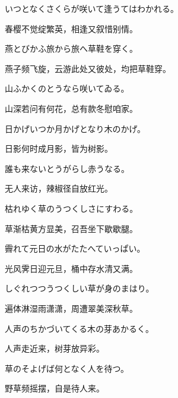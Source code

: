 \begin{haiku}
    {\FH いつとなくさくらが咲いて逢うてはわかれる。}

    {\FK 春樱不觉绽繁英，相逢又叙惜别情。}
\end{haiku}

\begin{haiku}
    {\FH 燕とびかふ旅から旅へ草鞋を穿く。}

    {\FK 燕子频飞旋，云游此处又彼处，均把草鞋穿。}
\end{haiku}

\begin{haiku}
    {\FH 山ふかくのとうなら咲いてゐる。}

    {\FK 山深若问有何花，总有款冬慰咱家。}
\end{haiku}

\begin{haiku}
    {\FH 日かげいつか月かげとなり木のかげ。}

    {\FK 日影何时成月影，皆为树影。}
\end{haiku}

\begin{haiku}
    {\FH 誰も来ないとうがらし赤うなる。}

    {\FK 无人来访，辣椒径自放红光。}
\end{haiku}

\begin{haiku}
    {\FH 枯れゆく草のうつくしさにすわる。}

    {\FK 草渐枯黄方显美，召吾坐下歇歇腿。}
\end{haiku}

\begin{haiku}
    {\FH 霽れて元日の水がたたへていっぱい。}

    {\FK 光风霁日迎元旦，桶中存水清又满。}
\end{haiku}

\begin{haiku}
    {\FH しぐれつつうつくしい草が身のまはり。}

    {\FK 遍体淋湿雨潇潇，周遭翠美深秋草。}
\end{haiku}

\begin{haiku}
    {\FH 人声のちかづいてくる木の芽あかるく。}

    {\FK 人声走近来，树芽放异彩。}
\end{haiku}

\begin{haiku}
    {\FH 草のそよげば何となく人を待つ。}

    {\FK 野草频摇摆，自是待人来。}
\end{haiku}

